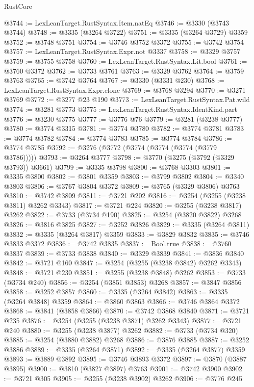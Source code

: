 \begin{lexlean}{RustCore}
\begin{coremodule}
@3744 := LexLeanTarget.RustSyntax.Item.natEq
@3746 := @3330 (@3743 @3744)
@3748 := @3335 (@3264 @3722)
@3751 := @3335 (@3264 @3729) @3359
@3752 := @3748 @3751
@3754 := @3746 @3752 @3372
@3755 := @3742 @3754
@3757 := LexLeanTarget.RustSyntax.Expr.not @3337
@3758 := @3329 @3757
@3759 := @3755 @3758
@3760 := LexLeanTarget.RustSyntax.Lit.bool
@3761 := @3760 @3372
@3762 := @3733 @3761
@3763 := @3329 @3762
@3764 := @3759 @3763
@3765 := @3742 @3764
@3767 := @3330 (@3331 @230)
@3768 := LexLeanTarget.RustSyntax.Expr.clone
@3769 := @3768 @3294
@3770 := @3271 @3769
@3772 := @3277 @23 @190
@3773 := LexLeanTarget.RustSyntax.Pat.wild
@3774 := @3281 @3773
@3775 := LexLeanTarget.RustSyntax.IdentKind.part
@3776 := @3230 @3775
@3777 := @3776 @76
@3779 := @3281 (@3238 @3777)
@3780 := @3774 @3315
@3781 := @3774 @3780
@3782 := @3774 @3781
@3783 := @3774 @3782
@3784 := @3774 @3783
@3785 := @3774 @3784
@3786 := @3774 @3785
@3792 := @3276 (@3772 (@3774 (@3774 (@3774 (@3779 @3786)))))
@3793 := @3264 @3777
@3798 := @3770 (@3275 (@3792 (@3329 @3793)) @3661)
@3799 := @3335 @3798
@3800 := @3768 @3303
@3801 := @3335 @3800
@3802 := @3801 @3359
@3803 := @3799 @3802
@3804 := @3340 @3803
@3806 := @3767 @3804 @3372
@3809 := @3765 (@3329 @3806) @3763
@3810 := @3742 @3809
@3811 := @3721 @202
@3816 := @3254 (@3255 (@3238 @3811) @3262 @3343)
@3817 := @3721 @224
@3820 := @3255 (@3238 @3817) @3262
@3822 := @3733 (@3734 @190)
@3825 := @3254 (@3820 @3822) @3268
@3826 := @3816 @3825
@3827 := @3252 @3826
@3829 := @3335 (@3264 @3811)
@3832 := @3335 (@3264 @3817) @3359
@3833 := @3829 @3832
@3835 := @3746 @3833 @3372
@3836 := @3742 @3835
@3837 := Bool.true
@3838 := @3760 @3837
@3839 := @3733 @3838
@3840 := @3329 @3839
@3841 := @3836 @3840
@3842 := @3721 @160
@3847 := @3254 (@3255 (@3238 @3842) @3262 @3343)
@3848 := @3721 @230
@3851 := @3255 (@3238 @3848) @3262
@3853 := @3733 (@3734 @240)
@3856 := @3254 (@3851 @3853) @3268
@3857 := @3847 @3856
@3858 := @3252 @3857
@3860 := @3335 (@3264 @3842)
@3863 := @3335 (@3264 @3848) @3359
@3864 := @3860 @3863
@3866 := @3746 @3864 @3372
@3868 := @3841 (@3858 @3866)
@3870 := @3742 @3868 @3840
@3871 := @3721 @235
@3876 := @3254 (@3255 (@3238 @3871) @3262 @3343)
@3877 := @3721 @240
@3880 := @3255 (@3238 @3877) @3262
@3882 := @3733 (@3734 @320)
@3885 := @3254 (@3880 @3882) @3268
@3886 := @3876 @3885
@3887 := @3252 @3886
@3889 := @3335 (@3264 @3871)
@3892 := @3335 (@3264 @3877) @3359
@3893 := @3889 @3892
@3895 := @3746 @3893 @3372
@3897 := @3870 (@3887 @3895)
@3900 := @3810 (@3827 @3897) @3763
@3901 := @3742 @3900
@3902 := @3721 @305
@3905 := @3255 (@3238 @3902) @3262
@3906 := @3776 @245

\end{coremodule}
\end{lexlean}
